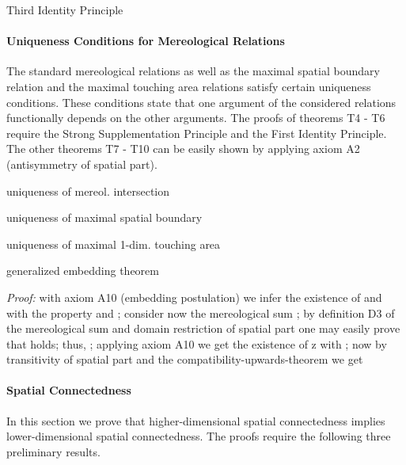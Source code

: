 \documentclass{ao2e}
\begin{document}
{\begin{enumAx} [A]            
            
\itemTP{\1ex] \mbox{}}
            {Third Identity Principle} 
            
\end{enumAx}
            
\paragraph{Uniqueness Conditions for Mereological Relations}
            
The standard mereological relations as well as the maximal spatial boundary relation and the maximal touching area relations satisfy certain uniqueness conditions. These conditions state that one argument of the considered relations functionally depends on the other arguments. The proofs of theorems T4 - T6 require the Strong Supplementation Principle and the First Identity Principle. The other theorems T7 - T10 can be easily shown by applying axiom A2 (antisymmetry of spatial part).   

\begin{enumAx}[T]
\itemTP{\1ex] \mbox{}}
            {uniqueness of mereol. intersection}
            
\itemTP{\1ex] \mbox{}}
            {uniqueness of maximal spatial boundary}             
            
\itemTP{\1ex] \mbox{}}
            {uniqueness of maximal 1-dim. touching area}  
            
\itemTP{\1ex] \mbox{}}
            {generalized embedding theorem} 
\end{enumAx}            

\noindent \textit{Proof:} with axiom A10 (embedding postulation) we infer the existence of  and  with the property  and ; consider now the mereological sum ; by definition D3 of the mereological sum and domain restriction of spatial part one may easily prove that  holds; thus, ; applying axiom A10 we get the existence of z with ; now by transitivity of spatial part and the compatibility-upwards-theorem we get
  \hfill      



\paragraph{Spatial Connectedness}

\noindent In this section we prove that higher-dimensional spatial connectedness implies lower-dimensional spatial connectedness. The proofs require the following three preliminary results.

}
\end{document}
